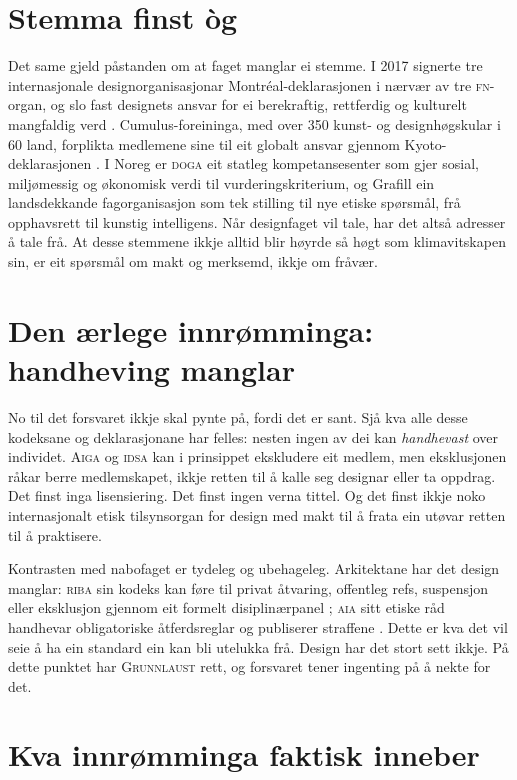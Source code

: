 \section{Stemma finst òg}

Det same gjeld påstanden om at faget manglar ei stemme. I 2017 signerte tre internasjonale designorganisasjonar Montréal-deklarasjonen i nærvær av tre \textsc{fn}-organ, og slo fast designets ansvar for ei berekraftig, rettferdig og kulturelt mangfaldig verd \autocite{montreal2017}. Cumulus-foreininga, med over 350 kunst- og designhøgskular i 60 land, forplikta medlemene sine til eit globalt ansvar gjennom Kyoto-deklarasjonen \autocite{kyoto2008}. I Noreg er \textsc{doga} eit statleg kompetansesenter som gjer sosial, miljømessig og økonomisk verdi til vurderingskriterium, og Grafill ein landsdekkande fagorganisasjon som tek stilling til nye etiske spørsmål, frå opphavsrett til kunstig intelligens. Når designfaget vil tale, har det altså adresser å tale frå. At desse stemmene ikkje alltid blir høyrde så høgt som klimavitskapen sin, er eit spørsmål om makt og merksemd, ikkje om fråvær.

\section{Den ærlege innrømminga: handheving manglar}

No til det forsvaret ikkje skal pynte på, fordi det er sant. Sjå kva alle desse kodeksane og deklarasjonane har felles: nesten ingen av dei kan \emph{handhevast} over individet. \textsc{Aiga} og \textsc{idsa} kan i prinsippet ekskludere eit medlem, men eksklusjonen råkar berre medlemskapet, ikkje retten til å kalle seg designar eller ta oppdrag. Det finst inga lisensiering. Det finst ingen verna tittel. Og det finst ikkje noko internasjonalt etisk tilsynsorgan for design med makt til å frata ein utøvar retten til å praktisere.

Kontrasten med nabofaget er tydeleg og ubehageleg. Arkitektane har det design manglar: \textsc{riba} sin kodeks kan føre til privat åtvaring, offentleg refs, suspensjon eller eksklusjon gjennom eit formelt disiplinærpanel \autocite{riba2019code}; \textsc{aia} sitt etiske råd handhevar obligatoriske åtferdsreglar og publiserer straffene \autocite{aia_ethics}. Dette er kva det vil seie å ha ein standard ein kan bli utelukka frå. Design har det stort sett ikkje. På dette punktet har \textsc{Grunnlaust} rett, og forsvaret tener ingenting på å nekte for det.

\section{Kva innrømminga faktisk inneber}

